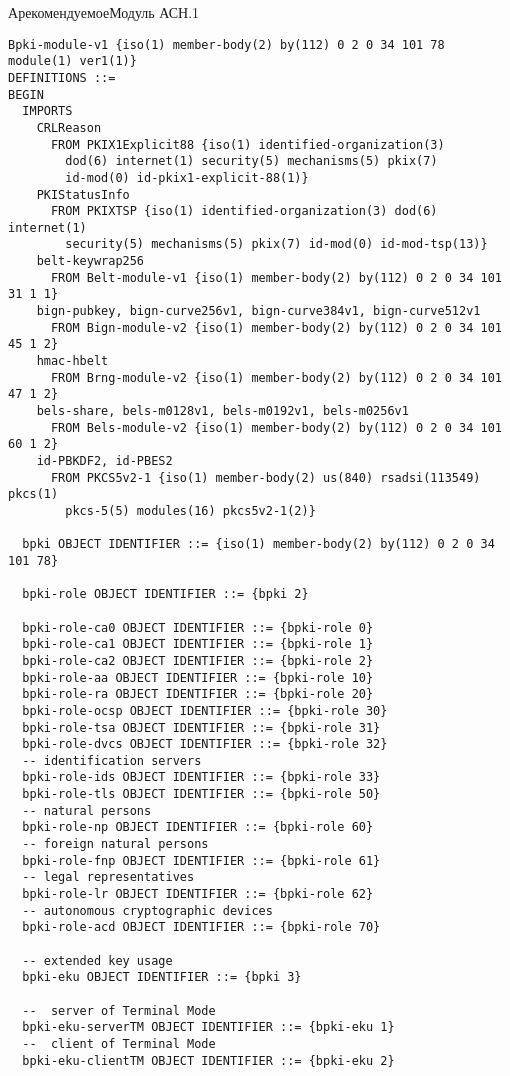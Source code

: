 \begin{appendix}{А}{рекомендуемое}{Модуль АСН.1}\label{ASN1}

\mbox{}

\begin{verbatim}
Bpki-module-v1 {iso(1) member-body(2) by(112) 0 2 0 34 101 78 module(1) ver1(1)}
DEFINITIONS ::=
BEGIN
  IMPORTS
    CRLReason
      FROM PKIX1Explicit88 {iso(1) identified-organization(3)
        dod(6) internet(1) security(5) mechanisms(5) pkix(7)
        id-mod(0) id-pkix1-explicit-88(1)}
    PKIStatusInfo
      FROM PKIXTSP {iso(1) identified-organization(3) dod(6) internet(1)
        security(5) mechanisms(5) pkix(7) id-mod(0) id-mod-tsp(13)}
    belt-keywrap256
      FROM Belt-module-v1 {iso(1) member-body(2) by(112) 0 2 0 34 101 31 1 1}
    bign-pubkey, bign-curve256v1, bign-curve384v1, bign-curve512v1
      FROM Bign-module-v2 {iso(1) member-body(2) by(112) 0 2 0 34 101 45 1 2}
    hmac-hbelt
      FROM Brng-module-v2 {iso(1) member-body(2) by(112) 0 2 0 34 101 47 1 2}
    bels-share, bels-m0128v1, bels-m0192v1, bels-m0256v1
      FROM Bels-module-v2 {iso(1) member-body(2) by(112) 0 2 0 34 101 60 1 2}
    id-PBKDF2, id-PBES2
      FROM PKCS5v2-1 {iso(1) member-body(2) us(840) rsadsi(113549) pkcs(1) 
        pkcs-5(5) modules(16) pkcs5v2-1(2)}

  bpki OBJECT IDENTIFIER ::= {iso(1) member-body(2) by(112) 0 2 0 34 101 78}

  bpki-role OBJECT IDENTIFIER ::= {bpki 2}

  bpki-role-ca0 OBJECT IDENTIFIER ::= {bpki-role 0}
  bpki-role-ca1 OBJECT IDENTIFIER ::= {bpki-role 1}
  bpki-role-ca2 OBJECT IDENTIFIER ::= {bpki-role 2}
  bpki-role-aa OBJECT IDENTIFIER ::= {bpki-role 10}
  bpki-role-ra OBJECT IDENTIFIER ::= {bpki-role 20}
  bpki-role-ocsp OBJECT IDENTIFIER ::= {bpki-role 30}
  bpki-role-tsa OBJECT IDENTIFIER ::= {bpki-role 31}
  bpki-role-dvcs OBJECT IDENTIFIER ::= {bpki-role 32}
  -- identification servers
  bpki-role-ids OBJECT IDENTIFIER ::= {bpki-role 33}
  bpki-role-tls OBJECT IDENTIFIER ::= {bpki-role 50}
  -- natural persons
  bpki-role-np OBJECT IDENTIFIER ::= {bpki-role 60}
  -- foreign natural persons
  bpki-role-fnp OBJECT IDENTIFIER ::= {bpki-role 61}
  -- legal representatives
  bpki-role-lr OBJECT IDENTIFIER ::= {bpki-role 62}
  -- autonomous cryptographic devices
  bpki-role-acd OBJECT IDENTIFIER ::= {bpki-role 70}

  -- extended key usage
  bpki-eku OBJECT IDENTIFIER ::= {bpki 3}

  --  server of Terminal Mode
  bpki-eku-serverTM OBJECT IDENTIFIER ::= {bpki-eku 1}
  --  client of Terminal Mode
  bpki-eku-clientTM OBJECT IDENTIFIER ::= {bpki-eku 2}


\end{verbatim}
\end{appendix}
